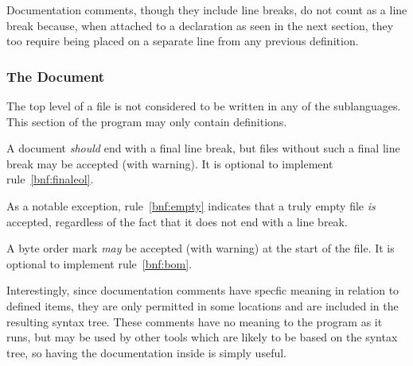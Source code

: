 Documentation comments, though they include line breaks, do not count as a line
break because, when attached to a declaration as seen in the next section, they
too require being placed on a separate line from any previous definition.

\subsubsection{The Document}

The top level of a \Trilogy{} file is not considered to be written in any
of the sublanguages. This section of the program may only contain definitions.

A \Trilogy{} document \emph{should} end with a final line break,
but files without such a final line break may be accepted (with warning).
It is optional to implement rule~\ref{bnf:finaleol}.

As a notable exception, rule~\ref{bnf:empty} indicates that a truly empty
file \emph{is} accepted, regardless of the fact that it does not end with
a line break.

A byte order mark \emph{may} be accepted (with warning) at the start of
the file. It is optional to implement rule~\ref{bnf:bom}.

Interestingly, since documentation comments have specfic meaning in relation
to defined items, they are only permitted in some locations and are included
in the resulting syntax tree. These comments have no meaning to the program
as it runs, but may be used by other tools which are likely to be based on the
syntax tree, so having the documentation inside is simply useful.

